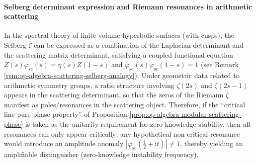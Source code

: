 \paragraph{Selberg determinant expression and Riemann resonances in arithmetic scattering}
\begin{remark}\label{rem:op-algebra-selberg-zeros-as-resonances}
In the spectral theory of finite-volume hyperbolic surfaces (with cusps), the Selberg \(\zeta\) can be expressed as a combination of the Laplacian determinant and the scattering matrix determinant,
satisfying a coupled functional equation \(Z(s)\varphi_{\mathrm{sc}}(s)=\eta(s)Z(1-s)\) and \(\varphi_{\mathrm{sc}}(s)\varphi_{\mathrm{sc}}(1-s)=1\)
(see Remark \ref{rem:op-algebra-scattering-selberg-analogy}).
Under geometric data related to arithmetic symmetry groups, a ratio structure involving \(\zeta(2s)\) and \(\zeta(2s-1)\) appears in the scattering determinant,
so that the zeros of the Riemann \(\zeta\) manifest as poles/resonances in the scattering object.
Therefore, if the ``critical line pure phase property'' of Proposition \ref{prop:op-algebra-modular-scattering-phase} is taken as the unitarity requirement for zero-knowledge stability,
then all resonances can only appear critically; any hypothetical non-critical resonance would introduce an amplitude anomaly \(|\varphi_{\mathrm{sc}}(\tfrac12+\mathrm{i}t)|\neq 1\),
thereby yielding an amplifiable distinguisher (zero-knowledge instability frequency).
\end{remark}

